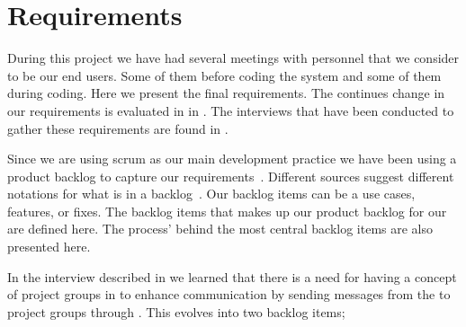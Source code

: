 \section{Requirements}
\label{sec:requirements}
During this project we have had several meetings with personnel that we consider to be our end users.
Some of them before coding the system and some of them during coding.
Here we present the final requirements.
The continues change in our requirements is evaluated in  in .
The interviews that have been conducted to gather these requirements are found in .

Since we are using scrum as our main development practice we have been using a product backlog to capture our requirements~\cite[p.~114]{Larman04}.
Different sources suggest different notations for what is in a backlog~\cite[p.~17]{scrumchecklist}\cite[pp.~123-124]{Larman04}.
Our backlog items can be a use cases, features, or fixes.
The backlog items that makes up our product backlog for our \subsystem{} are defined here.
The process' behind the most central backlog items are also presented here.

In the interview described in  we learned that there is a need for having a concept of project groups in \moodle{} to enhance communication by sending messages from the \admpers{} to project groups through \moodle{}.
This evolves into two backlog items; 